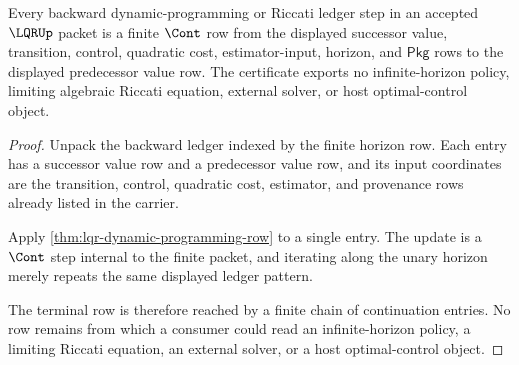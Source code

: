 \begin{theorem}
\label{thm:lqr-finite-horizon-riccati-closure}
Every backward dynamic-programming or Riccati ledger step in an accepted
$\LQRUp$ packet is a finite $\Cont$ row from the displayed successor value,
transition, control, quadratic cost, estimator-input, horizon, and
$\mathsf{Pkg}$ rows to the displayed predecessor value row. The certificate
exports no infinite-horizon policy, limiting algebraic Riccati equation,
external solver, or host optimal-control object.
\end{theorem}
\begin{proof}
Unpack the backward ledger indexed by the finite horizon row. Each entry has a
successor value row and a predecessor value row, and its input coordinates are
the transition, control, quadratic cost, estimator, and provenance rows
already listed in the carrier.

Apply \autoref{thm:lqr-dynamic-programming-row} to a single entry. The update
is a $\Cont$ step internal to the finite packet, and iterating along the unary
horizon merely repeats the same displayed ledger pattern.

The terminal row is therefore reached by a finite chain of continuation
entries. No row remains from which a consumer could read an infinite-horizon
policy, a limiting Riccati equation, an external solver, or a host
optimal-control object.
\end{proof}


